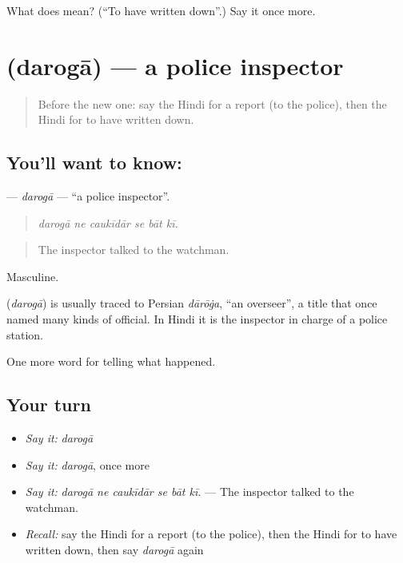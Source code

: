 \begin{tcolorbox}[breakable,colback=teal!4,colframe=teal!35!black,title={Before you move on}]
What does  mean? (\textquotedblleft{}To have written down\textquotedblright{}.) Say it once more.
\end{tcolorbox}
\section[\texorpdfstring{\hi{दरोगा} (darogā)}{दरोगा (darogā)}]{ (darogā) — a police inspector}

\label{lesson:HI-C290-daroga}



\begin{quote}
Before the new one: say the Hindi for a report (to the police), then the Hindi for to have written down.
\end{quote}

\subsection*{You'll want to know: }
\textbf{} — \emph{darogā} — \textquotedblleft{}a police inspector\textquotedblright{}.

\begin{quote}
     
\end{quote}

\begin{quote}
\emph{darogā ne caukīdār se bāt kī.}
\end{quote}

\begin{quote}
The inspector talked to the watchman.
\end{quote}

Masculine.

\begin{cousinweb}
\textbf{} (\emph{darogā}) is usually traced to Persian \emph{dārōġa}, \textquotedblleft{}an overseer\textquotedblright{}, a title that once named many kinds of official. In Hindi it is the inspector in charge of a police station.
\end{cousinweb}

\begin{grammarlens}[title={What you've built}]
One more word for telling what happened.
\end{grammarlens}

\subsection*{Your turn}
\begin{itemize}
\raggedright
  \item \emph{Say it:} \emph{darogā}
  \item \emph{Say it:} \emph{darogā}, once more
  \item \emph{Say it:} \emph{darogā ne caukīdār se bāt kī.} — The inspector talked to the watchman.
  \item \emph{Recall:} say the Hindi for a report (to the police), then the Hindi for to have written down, then say \emph{darogā} again
\end{itemize}

